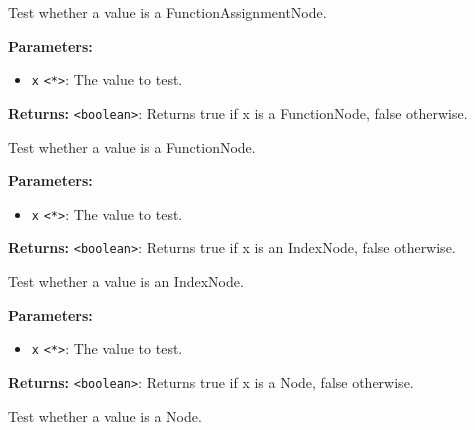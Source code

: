 \documentclass[12pt,a4paper]{article}
\begin{document}
\noindent Test whether a value is a FunctionAssignmentNode.

\vspace{5mm}
\noindent {}


\noindent \textbf{Parameters:}
\begin{itemize}
  \item \texttt{x} \texttt{<*>}: The value to test.
\end{itemize}

\noindent \textbf{Returns:} \texttt{<boolean>}: Returns true if \textasciigrave{}x\textasciigrave{} is a FunctionNode, false otherwise.

\noindent Test whether a value is a FunctionNode.

\vspace{5mm}
\noindent {}


\noindent \textbf{Parameters:}
\begin{itemize}
  \item \texttt{x} \texttt{<*>}: The value to test.
\end{itemize}

\noindent \textbf{Returns:} \texttt{<boolean>}: Returns true if \textasciigrave{}x\textasciigrave{} is an IndexNode, false otherwise.

\noindent Test whether a value is an IndexNode.

\vspace{5mm}
\noindent {}


\noindent \textbf{Parameters:}
\begin{itemize}
  \item \texttt{x} \texttt{<*>}: The value to test.
\end{itemize}

\noindent \textbf{Returns:} \texttt{<boolean>}: Returns true if \textasciigrave{}x\textasciigrave{} is a Node, false otherwise.

\noindent Test whether a value is a Node.

\vspace{5mm}
\noindent {}
\end{document}
